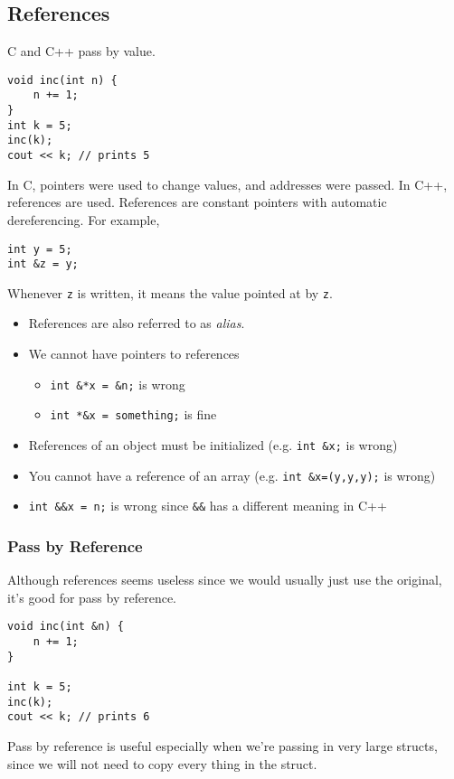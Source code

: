 \documentclass[12pt]{article}
\begin{document}
\subsection{References}
C and C++ pass by value.
\begin{lstlisting}
void inc(int n) {
    n += 1;
}
int k = 5;
inc(k);
cout << k; // prints 5
\end{lstlisting}
In C, pointers were used to change values, and addresses were passed. In C++, references are used. References are constant pointers with automatic dereferencing. For example,
\begin{lstlisting}
int y = 5;
int &z = y;
\end{lstlisting}
Whenever \lstinline{z} is written, it means the value pointed at by \lstinline{z}. 
\begin{itemize}
    \item References are also referred to as \textit{alias}.
    \item We cannot have pointers to references
    \begin{itemize}
        \item \lstinline{int &*x = &n;} is wrong
        \item \lstinline{int *&x = something;} is fine
    \end{itemize}
    \item References of an object must be initialized (e.g. \lstinline{int &x;} is wrong)
    \item You cannot have a reference of an array (e.g. \lstinline{int &x=(y,y,y);} is wrong)
    \item \lstinline{int &&x = n;} is wrong since \lstinline{&&} has a different meaning in C++
\end{itemize}

\subsubsection{Pass by Reference}
Although references seems useless since we would usually just use the original, it's good for pass by reference.

\begin{lstlisting}
void inc(int &n) {
    n += 1;
}

int k = 5;
inc(k);
cout << k; // prints 6
\end{lstlisting}

Pass by reference is useful especially when we're passing in very large structs, since we will not need to copy every thing in the struct.
\end{document}
